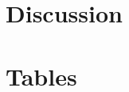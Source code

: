 \documentclass[12pt]{article}
\begin{document}








\section*{Discussion}



\section*{Tables}
\end{document}
